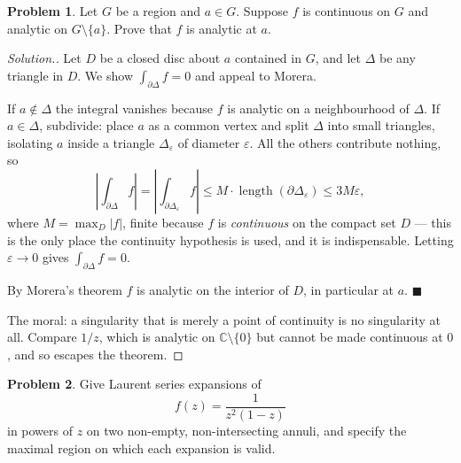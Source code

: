 \documentclass[11pt,a4paper]{article}
\theoremstyle{definition}
\newtheorem{problemx}{Problem}[section]
\newenvironment{problem}{\begin{problemx}}{\end{problemx}}
\newenvironment{solution}
  {\renewcommand{\qedsymbol}{}\begin{proof}[\textit{Solution}.]}
  {\end{proof}}
\begin{document}
\begin{problem}
Let $G$ be a region and $a \in G$. Suppose $f$ is continuous on $G$ and analytic
on $G\setminus\{a\}$. Prove that $f$ is analytic at $a$.
\end{problem}

\begin{solution}
Let $D$ be a closed disc about $a$ contained in $G$, and let $\Delta$ be any
triangle in $D$. We show $\int_{\partial\Delta} f = 0$ and appeal to Morera.

If $a \notin \Delta$ the integral vanishes because $f$ is analytic on a
neighbourhood of $\Delta$. If $a \in \Delta$, subdivide: place $a$ as a common
vertex and split $\Delta$ into small triangles, isolating $a$ inside a triangle
$\Delta_\varepsilon$ of diameter $\varepsilon$. All the others contribute nothing,
so
$$\left|\int_{\partial\Delta} f\right|
= \left|\int_{\partial\Delta_\varepsilon} f\right|
\leq M \cdot \operatorname{length}\left(\partial\Delta_\varepsilon\right)
\leq 3M\varepsilon,$$
where $M = \max_{D}\left|f\right|$, finite because $f$ is \emph{continuous} on the
compact set $D$ --- this is the only place the continuity hypothesis is used, and
it is indispensable. Letting $\varepsilon \rightarrow 0$ gives
$\int_{\partial\Delta} f = 0$.

By Morera's theorem $f$ is analytic on the interior of $D$, in particular at $a$.
$\blacksquare$

The moral: a singularity that is merely a point of continuity is no singularity at
all. Compare $1/z$, which is analytic on $\mathbb{C}\setminus\{0\}$ but cannot be
made continuous at $0$, and so escapes the theorem.
\end{solution}


\begin{problem}
Give Laurent series expansions of
$$f(z) = \frac{1}{z^{2}(1 - z)}$$
in powers of $z$ on two non-empty, non-intersecting annuli, and specify the
maximal region on which each expansion is valid.
\end{problem}
\end{document}
